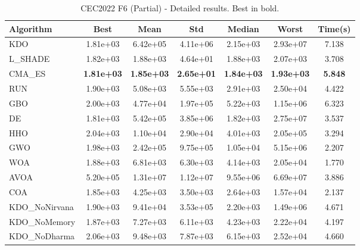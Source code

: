 \begin{table}[H]
\centering\small
\caption{CEC2022 F6 (Partial) - Detailed results. Best in bold.}
\label{tab:cec2022_F6}
\begin{tabular}{lcccccc}
\toprule
\textbf{Algorithm} & \textbf{Best} & \textbf{Mean} & \textbf{Std} & \textbf{Median} & \textbf{Worst} & \textbf{Time(s)} \\
\midrule
KDO & 1.81e+03 & 6.42e+05 & 4.11e+06 & 2.15e+03 & 2.93e+07 & 7.138 \\
L_SHADE & 1.82e+03 & 1.88e+03 & 4.64e+01 & 1.88e+03 & 2.07e+03 & 3.708 \\
CMA_ES & \textbf{1.81e+03} & \textbf{1.85e+03} & \textbf{2.65e+01} & \textbf{1.84e+03} & \textbf{1.93e+03} & \textbf{5.848} \\
RUN & 1.90e+03 & 5.08e+03 & 5.55e+03 & 2.91e+03 & 2.50e+04 & 4.422 \\
GBO & 2.00e+03 & 4.77e+04 & 1.97e+05 & 5.22e+03 & 1.15e+06 & 6.323 \\
DE & 1.81e+03 & 5.42e+05 & 3.85e+06 & 1.82e+03 & 2.75e+07 & 3.537 \\
HHO & 2.04e+03 & 1.10e+04 & 2.90e+04 & 4.01e+03 & 2.05e+05 & 3.294 \\
GWO & 1.98e+03 & 2.42e+05 & 9.75e+05 & 1.05e+04 & 5.15e+06 & 2.207 \\
WOA & 1.88e+03 & 6.81e+03 & 6.30e+03 & 4.14e+03 & 2.05e+04 & 1.770 \\
AVOA & 5.20e+05 & 1.31e+07 & 1.12e+07 & 9.55e+06 & 6.69e+07 & 3.886 \\
COA & 1.85e+03 & 4.25e+03 & 3.50e+03 & 2.64e+03 & 1.57e+04 & 2.137 \\
KDO_NoNirvana & 1.90e+03 & 9.41e+04 & 3.53e+05 & 2.20e+03 & 1.49e+06 & 4.671 \\
KDO_NoMemory & 1.87e+03 & 7.27e+03 & 6.11e+03 & 4.23e+03 & 2.22e+04 & 4.197 \\
KDO_NoDharma & 2.06e+03 & 9.48e+03 & 7.87e+03 & 6.15e+03 & 2.52e+04 & 4.660 \\
\bottomrule
\end{tabular}
\end{table}
